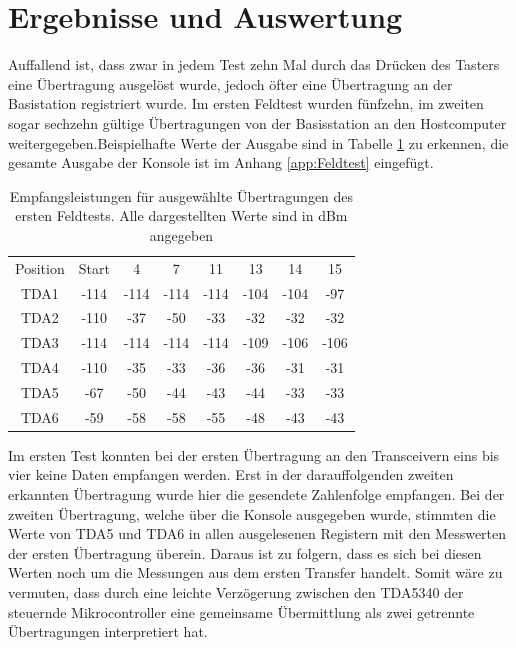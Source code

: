 \section{Ergebnisse und Auswertung}
Auffallend ist, dass zwar in jedem Test zehn Mal durch das Drücken des Tasters eine Übertragung ausgelöst wurde, jedoch öfter eine Übertragung an der Basistation registriert wurde. Im ersten Feldtest wurden fünfzehn, im zweiten sogar sechzehn gültige Übertragungen von der Basisstation an den Hostcomputer weitergegeben.Beispielhafte Werte der Ausgabe sind in Tabelle \ref{tab:gemesseneWerte} zu erkennen, die gesamte Ausgabe der Konsole ist im  Anhang \ref{app:Feldtest} eingefügt.


\begin{table}
	\centering
	\begin{tabular}{c|ccccccc}
		Position & Start & 4 & 7 & 11 & 13 & 14 & 15 \\ 
		TDA1 & -114 & -114 & -114 & -114 & -104 & -104 & -97 \\ 
		TDA2 & -110 & -37 & -50 & -33 & -32 & -32 & -32 \\ 
		TDA3 & -114 & -114 & -114 & -114 & -109 & -106 & -106 \\ 
		TDA4 & -110 & -35 & -33 & -36 & -36 & -31 & -31 \\ 
		TDA5 & -67 & -50 & -44 & -43 & -44 & -33 & -33 \\ 
		TDA6 & -59 & -58 & -58 & -55 & -48 & -43 & -43 \\ 
	\end{tabular} 
	\caption[Beispielhafte Empfangsleitungen des Feldtests]{Empfangsleistungen für ausgewählte Übertragungen des ersten Feldtests. Alle dargestellten Werte sind in dBm angegeben}
	\label{tab:gemesseneWerte}
\end{table}


Im ersten Test konnten bei der ersten Übertragung an den Transceivern eins bis vier keine Daten empfangen  werden. Erst in der darauffolgenden zweiten erkannten Übertragung wurde hier die gesendete Zahlenfolge empfangen. Bei der zweiten Übertragung, welche über die Konsole ausgegeben wurde, stimmten die Werte von TDA5 und TDA6 in allen ausgelesenen Registern mit den Messwerten der ersten Übertragung überein.  Daraus ist zu folgern, dass es sich bei diesen Werten noch um die Messungen aus dem ersten Transfer handelt. Somit wäre zu vermuten, dass durch eine leichte Verzögerung zwischen den TDA5340 der steuernde Mikrocontroller eine gemeinsame Übermittlung als zwei getrennte Übertragungen interpretiert hat.


